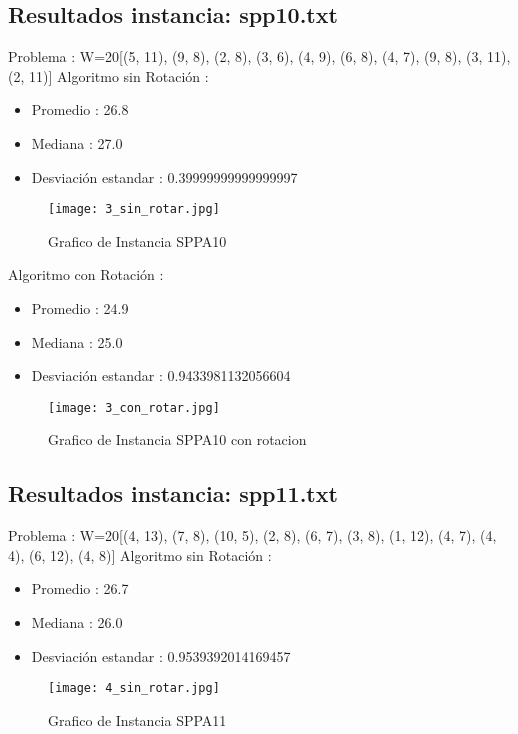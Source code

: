 \documentclass[10pt]{article}
\begin{document}
\subsection{Resultados instancia: spp10.txt}%
\label{subsec:Resultadosinstanciaspp10.txt}%
Problema : W=20{[}(5, 11), (9, 8), (2, 8), (3, 6), (4, 9), (6, 8), (4, 7), (9, 8), (3, 11), (2, 11){]} \newline%
%
 Algoritmo sin Rotación : %
\begin{itemize}%
\item%
Promedio : 26.8%
\item%
Mediana : 27.0%
\item%
Desviación estandar : 0.39999999999999997%
\end{itemize}

\begin{figure}[H]
\centerline{\texttt{[image: 3\_sin\_rotar.jpg]}}
\caption{Grafico de Instancia SPPA10 }
\label{fig_5}
\end{figure} 


%
Algoritmo con Rotación : %
\begin{itemize}%
\item%
Promedio : 24.9%
\item%
Mediana : 25.0%
\item%
Desviación estandar : 0.9433981132056604%
\end{itemize}%

\begin{figure}[H]
\centerline{\texttt{[image: 3\_con\_rotar.jpg]}}
\caption{Grafico de Instancia SPPA10 con rotacion}
\label{fig_6}
\end{figure} 


\subsection{Resultados instancia: spp11.txt}%
\label{subsec:Resultadosinstanciaspp11.txt}%
Problema : W=20{[}(4, 13), (7, 8), (10, 5), (2, 8), (6, 7), (3, 8), (1, 12), (4, 7), (4, 4), (6, 12), (4, 8){]} \newline%
%
 Algoritmo sin Rotación : %
\begin{itemize}%
\item%
Promedio : 26.7%
\item%
Mediana : 26.0%
\item%
Desviación estandar : 0.9539392014169457%
\end{itemize}


\begin{figure}[H]
\centerline{\texttt{[image: 4\_sin\_rotar.jpg]}}
\caption{Grafico de Instancia SPPA11}
\label{fig_7}
\end{figure} 
\end{document}
